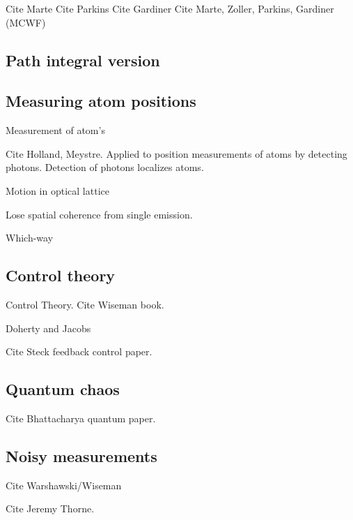 Cite Marte
Cite Parkins  
Cite Gardiner \cite{Gardiner1992}
Cite Marte, Zoller, Parkins, Gardiner (MCWF) \cite{Dalibard1992}
\cite{Dum1992}

\subsection{Path integral version}


\subsection{Measuring atom positions}

Measurement of atom's\cite{Caves1987}

 Cite Holland, Meystre.  Applied to position measurements of atoms by detecting photons.  Detection of photons localizes atoms.  
\cite{Holland1996}

Motion in optical lattice
\cite{Greenwood1997}

Lose spatial coherence from single emission.
\cite{Pfau1994}

Which-way \cite{Gagen1993}

\subsection{Control theory}
 Control Theory.  Cite Wiseman book.   \cite{WisemanMilburn2010}

Doherty and Jacobs \cite{Doherty1999}

Cite Steck feedback control paper.  \cite{Steck2004, Steck2006}

\subsection{Quantum chaos}

Cite Bhattacharya quantum paper.  \cite{Bhattacharya2000}

\subsection{Noisy measurements}
Cite Warshawski/Wiseman \cite{Warszawski2003a,Warszawski2003b}

Cite Jeremy Thorne.  


